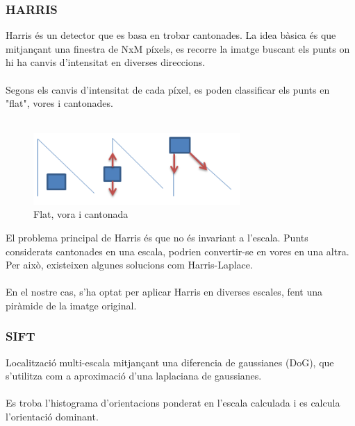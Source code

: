 	\subsubsection{HARRIS}
	Harris és un detector que es basa en trobar cantonades. La idea bàsica és que mitjançant una finestra de NxM píxels, es recorre la imatge buscant els punts on hi ha canvis d'intensitat
	en diverses direccions.\\\\
	Segons els canvis d'intensitat de cada píxel, es poden classificar els punts en "flat", vores i cantonades.\\\\
	\begin{figure}[H]
		\centering
		\includegraphics[width=0.7\textwidth]{images/harris}
		\caption{Flat, vora i cantonada}
	\end{figure}
	\noindent
	El problema principal de Harris és que no és invariant a l'escala. Punts considerats cantonades en una escala, podrien convertir-se en vores en una altra.
	Per això, existeixen algunes solucions com Harris-Laplace.\\\\
	En el nostre cas, s'ha optat per aplicar Harris en diverses escales, fent una piràmide de la imatge original.

	\subsubsection{SIFT}
	Localització multi-escala mitjançant una diferencia de gaussianes (DoG), que s'utilitza com a aproximació d'una laplaciana de gaussianes.\\\\
	Es troba l'histograma d'orientacions ponderat en l'escala calculada i es calcula l'orientació dominant.

